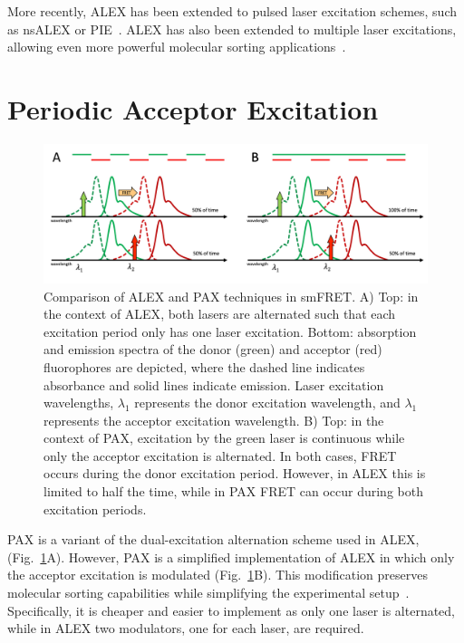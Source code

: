 More recently, \ac{ALEX} has been extended to pulsed laser excitation schemes, such as \ac{nsALEX} or \ac{PIE}~\cite{laurence_PNAS_2005, muller_BJ_2005}. 
\ac{ALEX} has also been extended to multiple laser excitations, allowing even more powerful molecular sorting applications~\cite{lee_BPJ_2007, yim_CC_2012}.

\section{Periodic Acceptor Excitation}
\label{sec:PAX_intro}

\begin{figure}
    \centering
    \includegraphics[width=\textwidth]{chapters/figures/ALEX_vs_PAX.jpg}
    \caption{\label{fig:ALEX_vs_PAX} 
    Comparison of \ac{ALEX} and \ac{PAX} techniques in \ac{smFRET}.
    A) Top: in the context of \ac{ALEX}, both lasers are alternated such that each excitation period only has one laser excitation.
    Bottom: absorption and emission spectra of the donor (green) and acceptor (red) fluorophores are depicted, where the dashed line indicates absorbance and solid lines indicate emission. 
    Laser excitation wavelengths, $\lambda_1$ represents the donor excitation wavelength, and $\lambda_1$ represents the acceptor excitation wavelength. 
    B) Top: in the context of \ac{PAX}, excitation by the green laser is continuous while only the acceptor excitation is alternated.
    In both cases, FRET occurs during the donor excitation period.
    However, in \ac{ALEX} this is limited to half the time, while in \ac{PAX} FRET can occur during both excitation periods. 
    }
\end{figure}

\ac{PAX} is a variant of the dual-excitation alternation scheme used in \ac{ALEX}, (Fig.~\ref{fig:ALEX_vs_PAX}A). 
However, \ac{PAX} is a simplified implementation of \ac{ALEX} in which only the acceptor excitation is modulated (Fig.~\ref{fig:ALEX_vs_PAX}B). 
This modification preserves molecular sorting capabilities while simplifying the experimental setup~\cite{doose_EBJ_2007}.
Specifically, it is cheaper and easier to implement as only one laser is alternated, while in \ac{ALEX} two modulators, one for each laser, are required.


